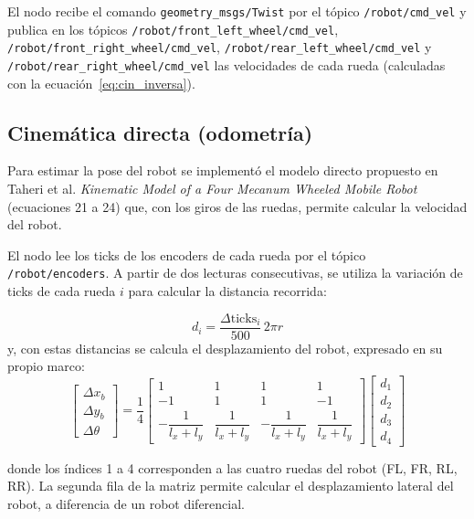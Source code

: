 \documentclass[11pt,a4paper]{article}
\begin{document}
El nodo recibe el comando \texttt{geometry\_msgs/Twist} por el tópico \texttt{/robot/cmd\_vel} y publica en los tópicos \texttt{/robot/front\_left\_wheel/cmd\_vel}, \texttt{/robot/front\_right\_wheel/cmd\_vel}, \texttt{/robot/rear\_left\_wheel/cmd\_vel} y \texttt{/robot/rear\_right\_wheel/cmd\_vel} las velocidades de cada rueda (calculadas con la ecuación~\eqref{eq:cin_inversa}).

\subsection{Cinemática directa (odometría)}

Para estimar la pose del robot se implementó el modelo directo propuesto en Taheri et al. \emph{Kinematic Model of a Four Mecanum Wheeled Mobile Robot}~\cite{taheri2015} (ecuaciones 21 a 24) que, con los giros de las ruedas, permite calcular la velocidad del robot. 

El nodo lee los ticks de los encoders de cada rueda por el tópico \texttt{/robot/encoders}. A partir de dos lecturas consecutivas, se utiliza la variación de ticks de cada rueda $i$ para calcular la distancia recorrida: 

\begin{equation}
d_i = \frac{\Delta\text{ticks}_i}{500}\,2\pi r
\end{equation}
y, con estas distancias se calcula el desplazamiento del robot, expresado en su propio marco:
\begin{equation}
\begin{bmatrix}\Delta x_b\\ \Delta y_b\\ \Delta\theta\end{bmatrix}
= \frac{1}{4}
\begin{bmatrix}
1 & 1 & 1 & 1\\
-1 & 1 & 1 & -1\\
-\dfrac{1}{l_x+l_y} & \dfrac{1}{l_x+l_y} & -\dfrac{1}{l_x+l_y} & \dfrac{1}{l_x+l_y}
\end{bmatrix}
\begin{bmatrix}d_1\\ d_2\\ d_3\\ d_4\end{bmatrix}
\label{eq:cin_directa}
\end{equation}

donde los índices 1 a 4 corresponden a las cuatro ruedas del robot (FL, FR, RL, RR). La segunda fila de la matriz permite calcular el desplazamiento lateral del robot, a diferencia de un robot diferencial. 
\end{document}
